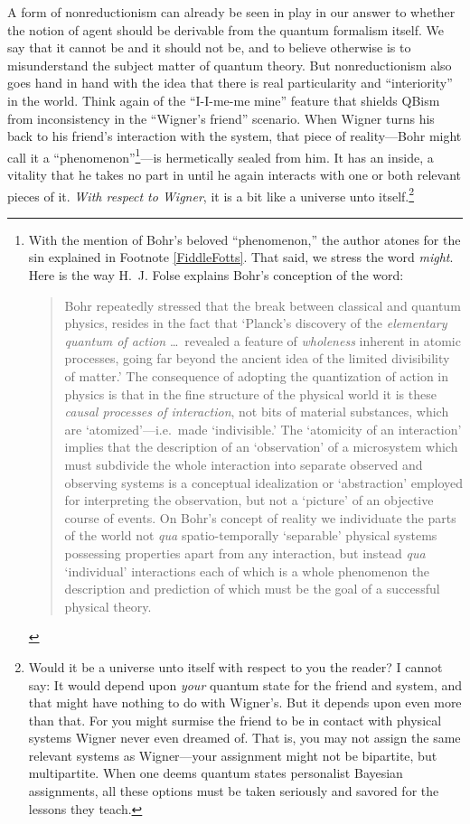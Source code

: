 A form of nonreductionism can already be seen in play in our answer to whether the notion of agent should be derivable from the quantum formalism itself.  We say that it cannot be and it should not be, and to believe otherwise is to misunderstand the subject matter of quantum theory.  But nonreductionism also goes hand in hand with the idea that there is real particularity and ``interiority'' in the world.  Think again of the ``I-I-me-me mine'' feature that shields QBism from inconsistency in the ``Wigner's friend'' scenario.
When Wigner turns his back to his friend's interaction with the system, that piece of reality---Bohr might call it a ``phenomenon''\footnote{With the mention of Bohr's beloved ``phenomenon,'' the author atones for the sin explained in Footnote \ref{FiddleFotts}.  That said, we stress the word {\it might}.  Here is the way H.~J. Folse \cite{Folse87b} explains Bohr's conception of the word:
\begin{quotation}\footnotesize
Bohr repeatedly stressed that the break between classical and quantum physics, resides in the fact that `Planck's discovery of the {\it elementary quantum of action\/} \ldots\ revealed a feature of {\it wholeness\/} inherent in atomic processes, going far be\-yond the ancient idea of the limited divisibility of matter.'  The consequence of adopting the quantization of action in physics is that in the fine structure of the physical world it is these {\it causal pro\-cesses of interaction}, not bits of material substances, which are `atomized'---i.e.\ made `indivisible.'  The `atomicity of an interaction' implies that the description of an `observation' of a microsystem which must subdivide the whole interaction into separate observed and observing systems is a conceptual idealization or `abstraction' employed for interpreting the observation, but not a `picture' of an objective course of events.  On Bohr's concept of reality we in\-di\-vid\-uate the parts of the world not {\it qua\/} spatio-temporally `sep\-arable' physical systems possessing properties apart from any interaction, but instead {\it qua\/} `individual' interactions each of which is a whole phenomenon the description and prediction of which must be the goal of a successful physical theory.\end{quotation}}---is hermetically sealed from him.  It has an inside, a vitality that he takes no part in until he again interacts with one or both relevant pieces of it.  {\it With respect to Wigner}, it is a bit like a universe unto itself.\footnote{Would it be a universe unto itself with respect to you the reader?  I cannot say:  It would depend upon {\it your\/} quantum state for the friend and system, and that might have nothing to do with Wigner's.  But it depends upon even more than that. For you might surmise the friend to be in contact with physical systems Wigner never even dreamed of.  That is, you may not assign the same relevant systems as Wigner---your assignment might not be bipartite, but multipartite.  When one deems quantum states personalist Bayesian assignments, all these options must be taken seriously and savored for the lessons they teach.}

